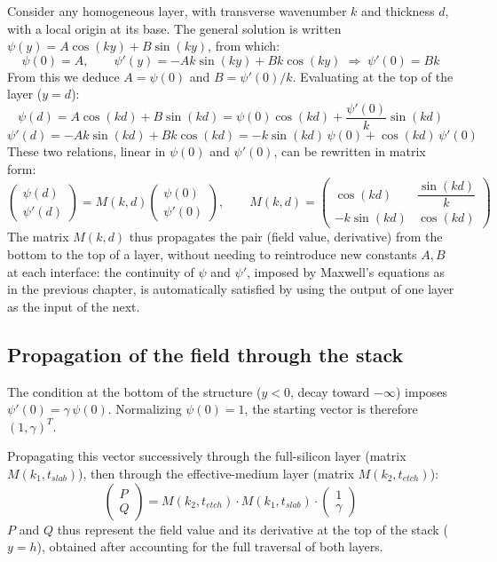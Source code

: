 \documentclass[a4paper,11pt]{report}
\begin{document}
Consider any homogeneous layer, with transverse wavenumber $k$ and thickness $d$, with a local origin at its base. The general solution is written $\psi(y)=A\cos(ky)+B\sin(ky)$, from which:
\begin{equation}
\psi(0)=A, \qquad \psi'(y)=-Ak\sin(ky)+Bk\cos(ky) \;\Rightarrow\; \psi'(0)=Bk
\end{equation}
From this we deduce $A=\psi(0)$ and $B=\psi'(0)/k$. Evaluating at the top of the layer ($y=d$):
\begin{equation}
\psi(d)=A\cos(kd)+B\sin(kd) = \psi(0)\cos(kd)+\frac{\psi'(0)}{k}\sin(kd)
\end{equation}
\begin{equation}
\psi'(d)=-Ak\sin(kd)+Bk\cos(kd) = -k\sin(kd)\,\psi(0)+\cos(kd)\,\psi'(0)
\end{equation}
These two relations, linear in $\psi(0)$ and $\psi'(0)$, can be rewritten in matrix form:
\begin{equation}
\begin{pmatrix}\psi(d)\\\psi'(d)\end{pmatrix} = M(k,d)\begin{pmatrix}\psi(0)\\\psi'(0)\end{pmatrix}, \qquad
M(k,d)=\begin{pmatrix}\cos(kd) & \dfrac{\sin(kd)}{k} \\[4pt] -k\sin(kd) & \cos(kd)\end{pmatrix}
\label{eq:matrice_transfert}
\end{equation}
The matrix $M(k,d)$ thus propagates the pair (field value, derivative) from the bottom to the top of a layer, without needing to reintroduce new constants $A,B$ at each interface: the continuity of $\psi$ and $\psi'$, imposed by Maxwell's equations as in the previous chapter, is automatically satisfied by using the output of one layer as the input of the next.

\subsection*{Propagation of the field through the stack}

The condition at the bottom of the structure ($y<0$, decay toward $-\infty$) imposes $\psi'(0)=\gamma\,\psi(0)$. Normalizing $\psi(0)=1$, the starting vector is therefore $(1,\gamma)^T$.

Propagating this vector successively through the full-silicon layer (matrix $M(k_1,t_{slab})$), then through the effective-medium layer (matrix $M(k_2,t_{etch})$):
\begin{equation}
\begin{pmatrix}P\\Q\end{pmatrix} = M(k_2,t_{etch})\cdot M(k_1,t_{slab})\cdot\begin{pmatrix}1\\\gamma\end{pmatrix}
\label{eq:propagation}
\end{equation}
$P$ and $Q$ thus represent the field value and its derivative at the top of the stack ($y=h$), obtained after accounting for the full traversal of both layers.
\end{document}
